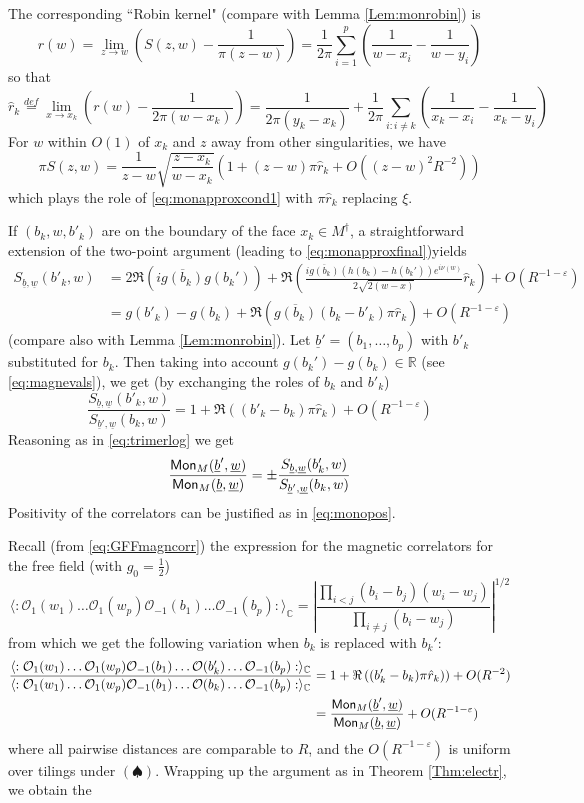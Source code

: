 \documentclass[10pt]{article}
\newcommand{\R}{\mathbb{R}}
\newcommand{\C}{\mathbb{C}}
\newcommand{\mc}{\mathcal}
\newcommand{\eps}{\varepsilon}
\newcommand{\dg}{\dagger}
\newcommand{\Mon}{{\sf Mon}}
\begin{document}
The corresponding ``Robin kernel" (compare with Lemma \ref{Lem:monrobin}) is 
$$r(w)=\lim_{z\rightarrow w}\left(S(z,w)-\frac{1}{\pi(z-w)}\right)=\frac {1}{2\pi}\sum_{i=1}^p\left(\frac{1}{w-x_i}-\frac 1{w-y_i}\right)$$
so that
$$\hat r_k\stackrel{def}{=}\lim_{x\rightarrow x_k}\left(r(w)-\frac 1{2\pi (w-x_k)}\right)=\frac{1}{2\pi(y_k-x_k)}+\frac {1}{2\pi}\sum_{i:i\neq k}\left(\frac{1}{x_k-x_i}-\frac 1{x_k-y_i}\right)$$
For $w$ within $O(1)$ of $x_k$ and $z$ away from other singularities, we have
\begin{equation*}
%
\pi S(z,w)=\frac{1}{z-w}\sqrt{\frac{z-x_k}{w-x_k}}\left(1+(z-w)\pi\hat r_k+O((z-w)^2R^{-2})\right)
%
%
%
%
%
%
%
%
\end{equation*}
which plays the role of \eqref{eq:monapproxcond1} with $\pi\hat r_k$ replacing $\xi$. 

If $(b_k,w,b'_k)$ are on the boundary of the face $x_k\in M^\dg$, a straightforward extension of the two-point argument (leading to \eqref{eq:monapproxfinal})yields
\begin{align*}
S_{\underline b,\underline w}(b'_k,w)&=2\Re(i\overline {g(b_k)}g(b_k'))+\Re\left(\frac{i\overline {g(b_k)}(h(b_k)-h(b_k'))e^{i\nu(w)}}{2\sqrt{2(w-x)}}\hat r_k\right)+O(R^{-1-\eps})\\
&=g(b'_k)-g(b_k)+\Re\left(\overline{g(b_k)}(b_k-b'_k)\pi\hat r_k\right)+O(R^{-1-\eps})
\end{align*}
(compare also with Lemma \ref{Lem:monrobin}). Let $\underline b'=(b_1,\dots,b_p)$ with $b'_k$ substituted for $b_k$. Then taking into account $g(b_k')-g(b_k)\in\R$ (see \eqref{eq:magnevals}), we get (by exchanging the roles of $b_k$ and $b'_k$)
$$\frac{S_{\underline b,\underline w}(b'_k,w)}
{S_{\underline b',\underline w}(b_k,w)}
=1+\Re\left((b'_k-b_k)\pi\hat r_k\right)+O(R^{-1-\eps})
$$
Reasoning as in \eqref{eq:trimerlog} we get
$$\frac{\Mon_M(\underline b',\underline w)}{\Mon_M(\underline b,\underline w)}=
\pm \frac{S_{\underline b,\underline w}(b'_k,w)}
{S_{\underline b',\underline w}(b_k,w)}$$
Positivity of the correlators can be justified as in \eqref{eq:monopos}.

Recall (from \eqref{eq:GFFmagncorr}) the expression for the magnetic correlators for the free field (with $g_0=\frac 12$)
$$\langle:{\mc O}_1(w_1)\dots{\mc O}_1(w_p){\mc O}_{-1}(b_1)\dots {\mc O}_{-1}(b_p):\rangle_\C=\left|\frac{\prod_{i<j}(b_i-b_j)(w_i-w_j)}{\prod_{i\neq j}(b_i-w_j)}\right|^{1/2}$$
from which we get the following variation when $b_k$ is replaced with $b_k'$: 
\begin{align*}
\frac{\langle:{\mc O}_1(w_1)\dots{\mc O}_1(w_p){\mc O}_{-1}(b_1)\dots{\mc O}(b'_k)\dots{\mc O}_{-1}(b_p):\rangle_\C
}
{\langle:{\mc O}_1(w_1)\dots{\mc O}_1(w_p){\mc O}_{-1}(b_1)\dots{\mc O}(b_k)\dots{\mc O}_{-1}(b_p):\rangle_\C}
&=1+\Re\left((b'_k-b_k)\pi\hat r_k)\right)+O(R^{-2})\\
&=\frac{\Mon_M(\underline b',\underline w)}{\Mon_M(\underline b,\underline w)}+O(R^{-1-\eps})
\end{align*}
where all pairwise distances are comparable to $R$, and the $O(R^{-1-\eps})$ is uniform over tilings under $(\spadesuit)$. Wrapping up the argument as in Theorem \ref{Thm:electr}, we obtain the
\end{document}
